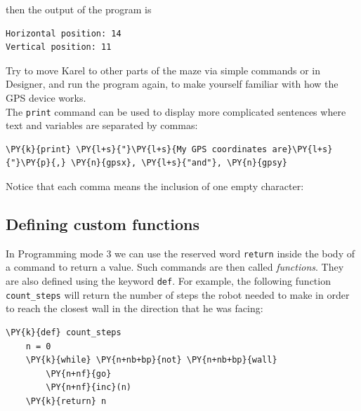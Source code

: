 \noindent
then the output of the program is\\

\begin{ybox}
\begin{verbatim}
Horizontal position: 14
Vertical position: 11
\end{verbatim}
\end{ybox}
\vspace{6mm}

\noindent
Try to move Karel to other parts of the maze via simple commands or in Designer, 
and run the program again, to make yourself familiar with how the GPS device works.\\

\noindent
The {\tt print} command can be used to display more complicated sentences where text
and variables are separated by commas:\\

\begin{bbox}
\begin{Verbatim}[commandchars=\\\{\}]
\PY{k}{print} \PY{l+s}{"}\PY{l+s}{My GPS coordinates are}\PY{l+s}{"}\PY{p}{,} \PY{n}{gpsx}, \PY{l+s}{"and"}, \PY{n}{gpsy}
\end{Verbatim}
\end{bbox}
\vspace{6mm}

\noindent
Notice that each comma means the inclusion of one empty character:


\subsection[\ \ Defining custom functions]{Defining custom functions}

In Programming mode 3 we can use the reserved word {\tt return} inside the body of
a command to return a value. Such commands are then called {\em functions}. 
They are also defined using the keyword {\tt def}. For example, the following function
{\tt count\_steps} will return the number of steps the robot needed to 
make in order to reach the closest wall in the direction that he was facing:\\

\begin{bbox}
\begin{Verbatim}[commandchars=\\\{\}]
\PY{k}{def} count_steps
    n = 0
    \PY{k}{while} \PY{n+nb+bp}{not} \PY{n+nb+bp}{wall}
        \PY{n+nf}{go}
        \PY{n+nf}{inc}(n)
    \PY{k}{return} n
\end{Verbatim}
\end{bbox}
\vspace{6mm}

